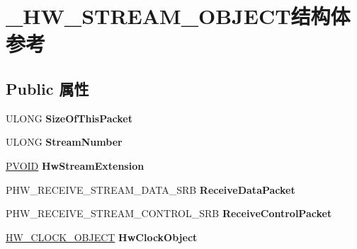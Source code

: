 \hypertarget{struct___h_w___s_t_r_e_a_m___o_b_j_e_c_t}{}\section{\+\_\+\+H\+W\+\_\+\+S\+T\+R\+E\+A\+M\+\_\+\+O\+B\+J\+E\+C\+T结构体 参考}
\label{struct___h_w___s_t_r_e_a_m___o_b_j_e_c_t}
\subsection*{Public 属性}
\begin{DoxyCompactItemize}
\item 
\mbox{\label{struct___h_w___s_t_r_e_a_m___o_b_j_e_c_t_a96789d1dc554e7d4240176ccb84675ed}} 
U\+L\+O\+NG {\bfseries Size\+Of\+This\+Packet}
\item 
\mbox{\label{struct___h_w___s_t_r_e_a_m___o_b_j_e_c_t_a7b6e10c3b8b92031f4906df5f27db851}} 
U\+L\+O\+NG {\bfseries Stream\+Number}
\item 
\mbox{\label{struct___h_w___s_t_r_e_a_m___o_b_j_e_c_t_acd9913706baf96de5d47a0036704d6b5}} 
\hyperlink{interfacevoid}{P\+V\+O\+ID} {\bfseries Hw\+Stream\+Extension}
\item 
\mbox{\label{struct___h_w___s_t_r_e_a_m___o_b_j_e_c_t_acb426687810bc4aba4ab6b6457dd07cc}} 
P\+H\+W\+\_\+\+R\+E\+C\+E\+I\+V\+E\+\_\+\+S\+T\+R\+E\+A\+M\+\_\+\+D\+A\+T\+A\+\_\+\+S\+RB {\bfseries Receive\+Data\+Packet}
\item 
\mbox{\label{struct___h_w___s_t_r_e_a_m___o_b_j_e_c_t_a8d1bf0a86ac08434cdeb529cc91d7ae5}} 
P\+H\+W\+\_\+\+R\+E\+C\+E\+I\+V\+E\+\_\+\+S\+T\+R\+E\+A\+M\+\_\+\+C\+O\+N\+T\+R\+O\+L\+\_\+\+S\+RB {\bfseries Receive\+Control\+Packet}
\item 
\mbox{\label{struct___h_w___s_t_r_e_a_m___o_b_j_e_c_t_ac6cfa6581d9e01c2ab7dff33c498d833}} 
\hyperlink{struct___h_w___c_l_o_c_k___o_b_j_e_c_t}{H\+W\+\_\+\+C\+L\+O\+C\+K\+\_\+\+O\+B\+J\+E\+CT} {\bfseries Hw\+Clock\+Object}

\end{DoxyCompactItemize}
